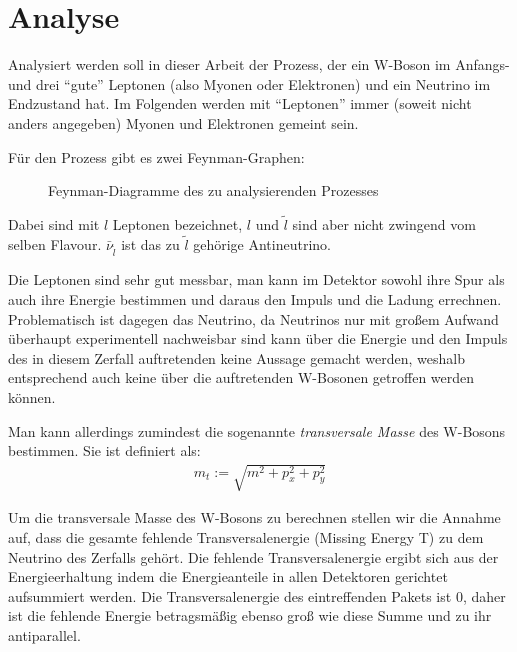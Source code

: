 \section{Analyse}
Analysiert werden soll in dieser Arbeit der Prozess, der ein W-Boson im Anfangs-
und drei "`gute"' Leptonen (also Myonen oder Elektronen) und ein Neutrino im
Endzustand hat. Im Folgenden werden mit "`Leptonen"' immer (soweit nicht anders
angegeben) Myonen und Elektronen gemeint sein.

Für den Prozess gibt es zwei Feynman-Graphen:

\begin{figure}[h!]
  \begin{minipage}{0.49\textwidth}
    \centering
    
  \end{minipage}
  \begin{minipage}{0.49\textwidth}
    \centering
    
  \end{minipage}
  \caption{Feynman-Diagramme des zu analysierenden Prozesses}
  \label{fig:feynman}
\end{figure}
Dabei sind mit $l$ Leptonen bezeichnet, $l$ und $\tilde l$ sind aber nicht
zwingend vom selben Flavour. $\bar \nu_{\tilde l}$ ist das zu $\tilde l$
gehörige Antineutrino.

Die Leptonen sind sehr gut messbar, man kann im Detektor sowohl ihre Spur als
auch ihre Energie bestimmen und daraus den Impuls und die Ladung errechnen.
Problematisch ist dagegen das Neutrino, da Neutrinos nur mit großem Aufwand
überhaupt experimentell nachweisbar sind\cite{needed} kann über die Energie und
den Impuls des in diesem Zerfall auftretenden keine Aussage gemacht werden,
weshalb entsprechend auch keine über die auftretenden W-Bosonen getroffen werden
können.

\label{cha:met}
Man kann allerdings zumindest die sogenannte \emph{transversale Masse} des
W-Bosons bestimmen. Sie ist definiert als:
\begin{align}
  m_t := \sqrt{m^2 + p_x^2 + p_y^2}
  \label{def:trans}
\end{align}

Um die transversale Masse des W-Bosons zu berechnen stellen wir die Annahme auf,
dass die gesamte fehlende Transversalenergie (Missing Energy T) zu dem Neutrino
des Zerfalls gehört. Die fehlende Transversalenergie ergibt sich aus der
Energieerhaltung indem die Energieanteile in allen Detektoren gerichtet aufsummiert
werden. Die Transversalenergie des eintreffenden Pakets ist $0$, daher ist die
fehlende Energie betragsmäßig ebenso groß wie diese Summe und zu ihr
antiparallel.

